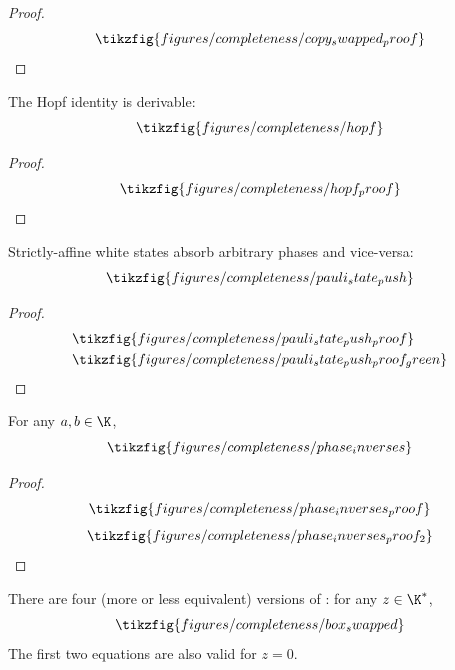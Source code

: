\begin{proof}
  \begin{equation}
    \tikzfig{figures/completeness/copy_swapped_proof}
  \end{equation}
\end{proof}
\begin{lemma}
  \label{lem:hopf}
  The Hopf identity is derivable:
  \begin{equation*}
    \tikzfig{figures/completeness/hopf}
  \end{equation*}
\end{lemma}
\begin{proof}
  \begin{equation}
    \tikzfig{figures/completeness/hopf_proof}
  \end{equation}
\end{proof}
\begin{lemma}
  \label{lem:push_pauli_state}
  Strictly-affine white states absorb arbitrary phases and vice-versa:
  \begin{equation*}
    \tikzfig{figures/completeness/pauli_state_push}
  \end{equation*}
\end{lemma}
\begin{proof}
  \begin{align}
    &\tikzfig{figures/completeness/pauli_state_push_proof} \\
    &\tikzfig{figures/completeness/pauli_state_push_proof_green}
  \end{align}
\end{proof}
\begin{lemma}
  \label{lem:phase_inverses}
  For any \(a,b \in \K\),
  \begin{equation*}
    \tikzfig{figures/completeness/phase_inverses}
  \end{equation*}
\end{lemma}
\begin{proof}
  \begin{equation}
    \tikzfig{figures/completeness/phase_inverses_proof}
  \end{equation}
  \begin{equation}
    \tikzfig{figures/completeness/phase_inverses_proof_2}
  \end{equation}
\end{proof}
\begin{lemma}
  \label{lem:box_swapped}
  There are four (more or less equivalent) versions of \TextHBox: for any
  \(z \in \K^*\),
  \begin{equation*}
    \tikzfig{figures/completeness/box_swapped}
  \end{equation*}
  The first two equations are also valid for \(z = 0\).
\end{lemma}
